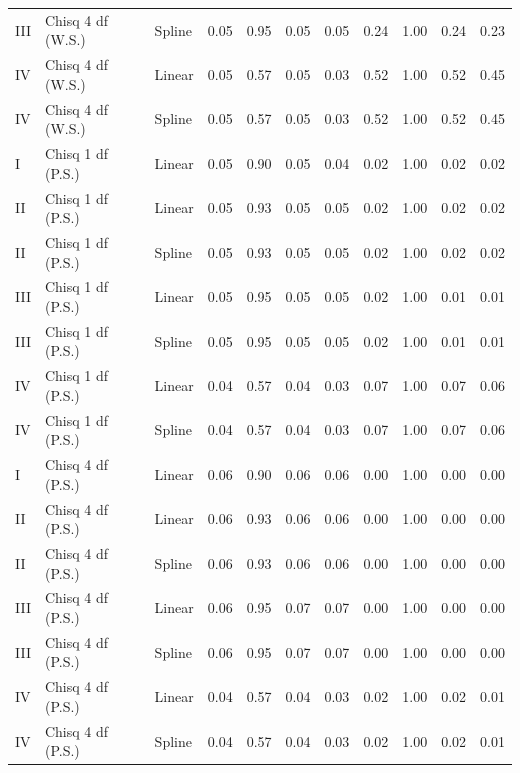 \documentclass{article}\usepackage[]{graphicx}\usepackage[]{color}
\begin{document}
\begin{table}[ht]
\begin{tabular}{lll|llll|llll}
  III & Chisq 4 df (W.S.) & Spline & 0.05 & 0.95 & 0.05 & 0.05 & 0.24 & 1.00 & 0.24 & 0.23 \\ 
  IV & Chisq 4 df (W.S.) & Linear & 0.05 & 0.57 & 0.05 & 0.03 & 0.52 & 1.00 & 0.52 & 0.45 \\ 
  IV & Chisq 4 df (W.S.) & Spline & 0.05 & 0.57 & 0.05 & 0.03 & 0.52 & 1.00 & 0.52 & 0.45 \\ 
   \hline
I & Chisq 1 df (P.S.) & Linear & 0.05 & 0.90 & 0.05 & 0.04 & 0.02 & 1.00 & 0.02 & 0.02 \\ 
  II & Chisq 1 df (P.S.) & Linear & 0.05 & 0.93 & 0.05 & 0.05 & 0.02 & 1.00 & 0.02 & 0.02 \\ 
  II & Chisq 1 df (P.S.) & Spline & 0.05 & 0.93 & 0.05 & 0.05 & 0.02 & 1.00 & 0.02 & 0.02 \\ 
  III & Chisq 1 df (P.S.) & Linear & 0.05 & 0.95 & 0.05 & 0.05 & 0.02 & 1.00 & 0.01 & 0.01 \\ 
  III & Chisq 1 df (P.S.) & Spline & 0.05 & 0.95 & 0.05 & 0.05 & 0.02 & 1.00 & 0.01 & 0.01 \\ 
  IV & Chisq 1 df (P.S.) & Linear & 0.04 & 0.57 & 0.04 & 0.03 & 0.07 & 1.00 & 0.07 & 0.06 \\ 
  IV & Chisq 1 df (P.S.) & Spline & 0.04 & 0.57 & 0.04 & 0.03 & 0.07 & 1.00 & 0.07 & 0.06 \\ 
   \hline
I & Chisq 4 df (P.S.) & Linear & 0.06 & 0.90 & 0.06 & 0.06 & 0.00 & 1.00 & 0.00 & 0.00 \\ 
  II & Chisq 4 df (P.S.) & Linear & 0.06 & 0.93 & 0.06 & 0.06 & 0.00 & 1.00 & 0.00 & 0.00 \\ 
  II & Chisq 4 df (P.S.) & Spline & 0.06 & 0.93 & 0.06 & 0.06 & 0.00 & 1.00 & 0.00 & 0.00 \\ 
  III & Chisq 4 df (P.S.) & Linear & 0.06 & 0.95 & 0.07 & 0.07 & 0.00 & 1.00 & 0.00 & 0.00 \\ 
  III & Chisq 4 df (P.S.) & Spline & 0.06 & 0.95 & 0.07 & 0.07 & 0.00 & 1.00 & 0.00 & 0.00 \\ 
  IV & Chisq 4 df (P.S.) & Linear & 0.04 & 0.57 & 0.04 & 0.03 & 0.02 & 1.00 & 0.02 & 0.01 \\ 
  IV & Chisq 4 df (P.S.) & Spline & 0.04 & 0.57 & 0.04 & 0.03 & 0.02 & 1.00 & 0.02 & 0.01 \\ 
   \hline
\end{tabular}
\end{table}
\end{document}

